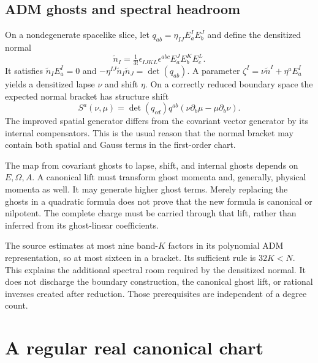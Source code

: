 \subsection{ADM ghosts and spectral headroom}
On a nondegenerate spacelike slice, let
$q_{ab}=\eta_{IJ}E_a^IE_b^J$ and define the densitized normal
\begin{equation}
 \widetilde n_I=\tfrac1{3!}\epsilon_{IJKL}\epsilon^{abc}E_a^JE_b^KE_c^L.
\end{equation}
It satisfies $\widetilde n_IE_a^I=0$ and
$-\eta^{IJ}\widetilde n_I\widetilde n_J=\det(q_{ab})$.
A parameter $\zeta^I=\nu\widetilde n^I+\eta^aE_a^I$ yields a densitized lapse $\nu$ and shift $\eta$. On a correctly reduced boundary space the expected normal bracket has structure shift
\begin{equation}
 S^a(\nu,\mu)=\det(q_{cd})q^{ab}
                          (\nu\partial_b\mu-\mu\partial_b\nu).
\end{equation}
The improved spatial generator differs from the covariant vector generator by its internal compensators. This is the usual reason that the normal bracket may contain both spatial and Gauss terms in the first-order chart.

The map from covariant ghosts to lapse, shift, and internal ghosts depends on $E,\Omega,A$. A canonical lift must transform ghost momenta and, generally, physical momenta as well. It may generate higher ghost terms. Merely replacing the ghosts in a quadratic formula does not prove that the new formula is canonical or nilpotent. The complete charge must be carried through that lift, rather than inferred from its ghost-linear coefficients.

The source estimates at most nine band-$K$ factors in its polynomial ADM representation, so at most sixteen in a bracket. Its sufficient rule is $32K<N$. This explains the additional spectral room required by the densitized normal. It does not discharge the boundary construction, the canonical ghost lift, or rational inverses created after reduction. Those prerequisites are independent of a degree count.

\section{A regular real canonical chart}
\label{c:constraints:reduction}

